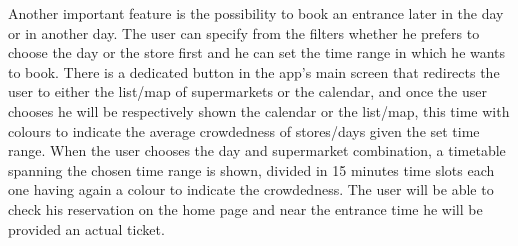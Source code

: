 Another important feature is the possibility to book an entrance later in the day or in another day. The user can specify from the filters whether he prefers to choose the day or the store first and he can set the time range in which he wants to book. 
There is a dedicated button in the app’s main screen that redirects the user to either the list/map of supermarkets or the calendar, and once the user chooses he will be respectively shown the calendar or the list/map, this time with colours to indicate the average crowdedness of stores/days given the set time range.
When the user chooses the day and supermarket combination, a timetable spanning the chosen time range is shown, divided in 15 minutes time slots each one having again a colour to indicate the crowdedness. The user will be able to check his reservation on the home page and near the entrance time he will be provided an actual ticket.\\
